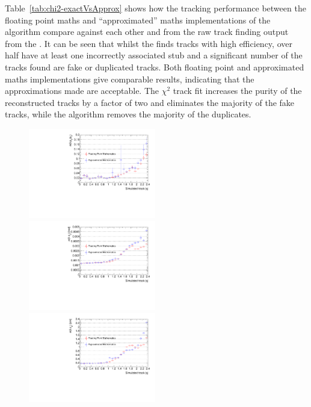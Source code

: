 Table~\ref{tab:chi2-exactVsApprox} shows how the tracking performance between the floating point maths and ``approximated'' maths implementations of the algorithm compare against each other and from the raw track finding output from the \HT.
It can be seen that whilst the \HT finds tracks with high efficiency, over half have at least one incorrectly associated stub and a significant number of the tracks found are fake or duplicated tracks.
Both floating point and approximated maths implementations give comparable results, indicating that the approximations made are acceptable.
The $\chi^{2}$ track fit increases the purity of the reconstructed tracks by a factor of two and eliminates the majority of the fake tracks, while the \DR algorithm removes the majority of the duplicates.


\begin{figure}[htb]
\centering
\includegraphics[width=0.495\textwidth]{figs/tk-upgrade/results-chi2fitter/ptRelResVsEta_It_1_ApproxVsExact.pdf}
\includegraphics[width=0.495\textwidth]{figs/tk-upgrade/results-chi2fitter/phi0ResVsEta_It_1_ApproxVsExact.pdf}
\\
\includegraphics[width=0.495\textwidth]{figs/tk-upgrade/results-chi2fitter/z0ResVsEta_It_1_ApproxVsExact.pdf}

\end{figure}
